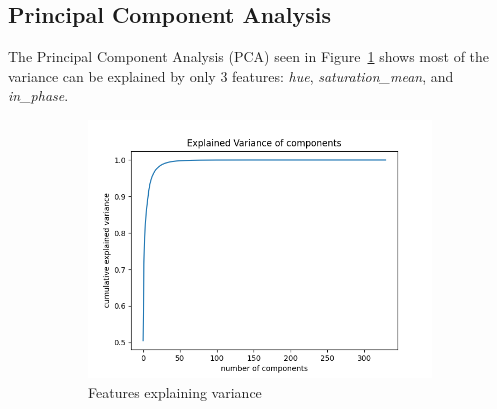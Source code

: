 \documentclass[letterpaper]{article}
\begin{document}
{\begin{tiny}
\end{tiny}
 
\subsection{Principal Component Analysis}
The Principal Component Analysis (PCA) \parencite{Muller2016-ui} seen in Figure~\ref{fig:pca} shows most of the variance can be explained by only 3 features: \textit{hue}, \textit{saturation\_mean}, and \textit{in\_phase}.
\begin{figure}[h]
	\centering
	\begin{subfigure}[h]{.48\textwidth}
		  \centering
		  \includegraphics[width=1\linewidth]{figures/pca.png}
		  \caption{Features explaining variance}
		  \label{fig:pca}
	\end{subfigure}
	\begin{subfigure}[h]{.32\textwidth}
	  \centering
	  	
		{
		\centering\settowidth{}
		\renewcommand\theadalign{cl}\renewcommand\cellalign{cl}
		\renewcommand\theadfont{\bfseries}
		\renewcommand\tabcolsep{4pt}\renewcommand\arraystretch{1.25}
		\footnotesize
		
}
\end{subfigure}
\end{figure}}
\end{document}
